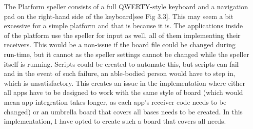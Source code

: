 The Platform speller consists of a full QWERTY-style keyboard and a navigation pad on the right-hand side of the keyboard[see Fig 3.3]. This may seem a bit excessive for a simple platform and that is because it is. The applications inside of the platform use the speller for input as well, all of them implementing their receivers. This would be a non-issue if the board file could be changed during run-time, but it cannot as the speller settings cannot be changed while the speller itself is running. Scripts could be created to automate this, but scripts can fail and in the event of such failure, an able-bodied person would have to step in, which is unsatisfactory. This creates an issue in the implementation where either all apps have to be designed to work with the same style of board (which would mean app integration takes longer, as each app's receiver code needs to be changed) or an umbrella board that covers all bases needs to be created. In this implementation, I have opted to create such a board that covers all needs.


